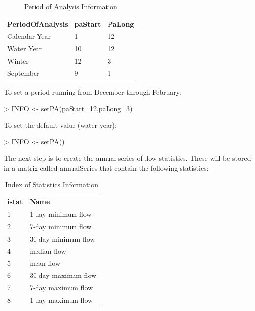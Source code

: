\documentclass[a4paper,11pt]{article}
\begin{document}
\begin{table}[!ht]
\begin{center}
\caption{Period of Analysis Information}
\label{table:paINFO}
\begin{tabular}{lll}
  \hline
PeriodOfAnalysis & paStart & PaLong \\ 
  \hline
Calendar Year & 1 & 12 \\ 
  Water Year & 10 & 12 \\ 
  Winter & 12 & 3 \\ 
  September & 9 & 1 \\ 
   \hline
\end{tabular}
\end{center}
\end{table}
To set a period running from December through February:
\begin{Schunk}
\begin{Sinput}
> INFO <- setPA(paStart=12,paLong=3)
\end{Sinput}
\end{Schunk}

To set the default value (water year):
\begin{Schunk}
\begin{Sinput}
> INFO <- setPA()
\end{Sinput}
\end{Schunk}

The next step is to create the annual series of flow statistics.  These will be stored in a matrix called annualSeries that contain the following statistics:

\begin{table}[!ht]
\begin{center}
\caption{Index of Statistics Information}
\label{table:istat}
\begin{tabular}{ll}
  \hline
istat & Name \\ 
  \hline
1 & 1-day minimum flow \\ 
  2 & 7-day minimum flow \\ 
  3 & 30-day minimum flow \\ 
  4 & median flow \\ 
  5 & mean flow \\ 
  6 & 30-day maximum flow \\ 
  7 & 7-day maximum flow \\ 
  8 & 1-day maximum flow \\ 
   \hline
\end{tabular}
\end{center}
\end{table}
\end{document}
